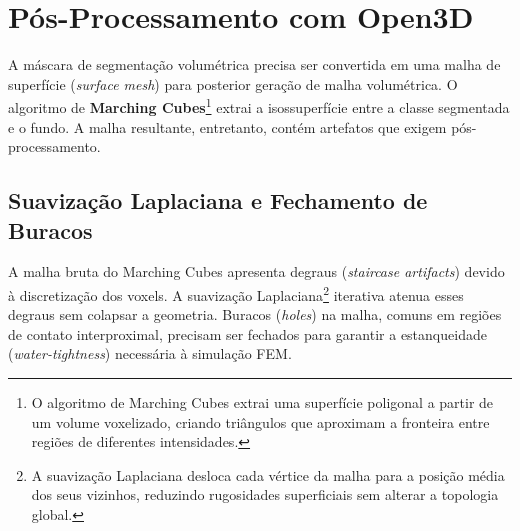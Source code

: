 \section{Pós-Processamento com Open3D}
\label{sec:pos-processamento}

A máscara de segmentação volumétrica precisa ser convertida em uma
malha de superfície (\textit{surface mesh}) para posterior geração de
malha volumétrica. O algoritmo de \textbf{Marching Cubes}\footnote{O
algoritmo de Marching Cubes extrai uma superfície poligonal a partir
de um volume voxelizado, criando triângulos que aproximam a fronteira
entre regiões de diferentes intensidades.} extrai a isossuperfície
entre a classe segmentada e o fundo. A malha resultante,
entretanto, contém artefatos que exigem pós-processamento.

\subsection{Suavização Laplaciana e Fechamento de Buracos}

A malha bruta do Marching Cubes apresenta degraus
(\textit{staircase artifacts}) devido à discretização dos voxels. A
suavização Laplaciana\footnote{A suavização Laplaciana desloca cada
vértice da malha para a posição média dos seus vizinhos, reduzindo
rugosidades superficiais sem alterar a topologia global.} iterativa
atenua esses degraus sem colapsar a geometria. Buracos
(\textit{holes}) na malha, comuns em regiões de contato
interproximal, precisam ser fechados para garantir a estanqueidade
(\textit{water-tightness}) necessária à simulação FEM.

